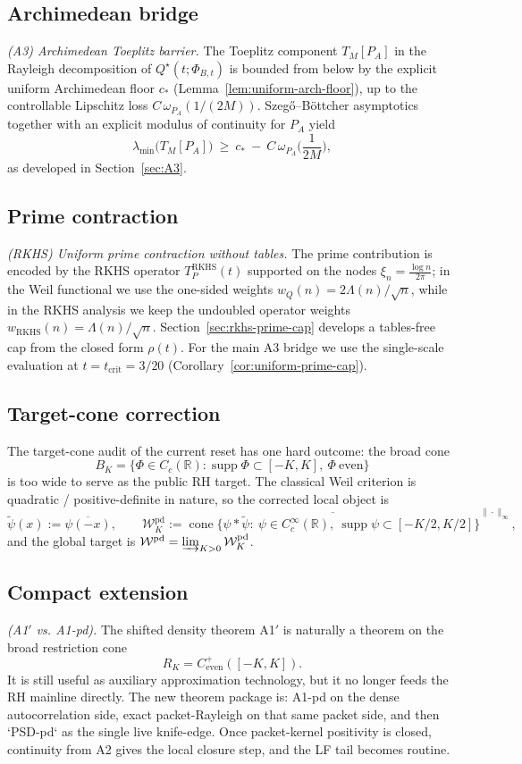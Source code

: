\subsection*{Archimedean bridge}
\emph{(A3) Archimedean Toeplitz barrier.} The Toeplitz component $T_M[P_A]$ in the Rayleigh decomposition of $Q^\star(t;\Phi_{B,t})$ is bounded from below by the explicit uniform Archimedean floor $c_*$ (Lemma~\ref{lem:uniform-arch-floor}), up to the controllable Lipschitz loss $C\,\omega_{P_A}(1/(2M))$. Szeg\H{o}--B\"ottcher asymptotics together with an explicit modulus of continuity for $P_A$ yield
\[
  \lambda_{\min}\!\big(T_M[P_A]\big)\ \ge\ c_*\ -\ C\,\omega_{P_A}\!\Big(\frac{1}{2M}\Big),
\]
as developed in Section~\ref{sec:A3}.

\subsection*{Prime contraction}
\emph{(RKHS) Uniform prime contraction without tables.} The prime contribution is encoded by the RKHS operator $T_P^{\mathrm{RKHS}}(t)$ supported on the nodes $\xi_n=\frac{\log n}{2\pi}$; in the Weil functional we use the one-sided weights $w_Q(n)=2\Lambda(n)/\sqrt{n}$, while in the RKHS analysis we keep the undoubled operator weights $w_{\mathrm{RKHS}}(n)=\Lambda(n)/\sqrt{n}$. Section~\ref{sec:rkhs-prime-cap} develops a tables-free cap from the closed form $\rho(t)$. For the main A3 bridge we use the single-scale evaluation at $t=t_{\mathrm{crit}}=3/20$ (Corollary~\ref{cor:uniform-prime-cap}).

\subsection*{Target-cone correction}
The target-cone audit of the current reset has one hard outcome: the broad cone
\[
  B_K=\{\Phi\in C_c(\mathbb R): \operatorname{supp}\Phi\subset[-K,K],\ \Phi\ \text{even}\}
\]
is too wide to serve as the public RH target. The classical Weil criterion is quadratic / positive-definite in nature, so the corrected local object is
\[
  \widetilde{\psi}(x):=\overline{\psi(-x)},
  \qquad
  \mathcal W_K^{\mathrm{pd}}
  := \overline{\operatorname{cone}\{\psi * \widetilde{\psi}:\ \psi\in C_c^\infty(\mathbb R),\ \operatorname{supp}\psi\subset[-K/2,K/2]\}}^{\|\cdot\|_\infty},
\]
and the global target is $\mathcal W^{\mathrm{pd}}=\varinjlim_{K>0}\mathcal W_K^{\mathrm{pd}}$.

\subsection*{Compact extension}
\emph{(A1$'$ vs. A1-pd).} The shifted density theorem A1$'$ is naturally a theorem on the broad restriction cone
\[
  R_K = C^+_{\mathrm{even}}([-K,K]).
\]
It is still useful as auxiliary approximation technology, but it no longer feeds the RH mainline directly. The new theorem package is: A1-pd on the dense autocorrelation side, exact packet-Rayleigh on that same packet side, and then `PSD-pd` as the single live knife-edge. Once packet-kernel positivity is closed, continuity from A2 gives the local closure step, and the LF tail becomes routine.

